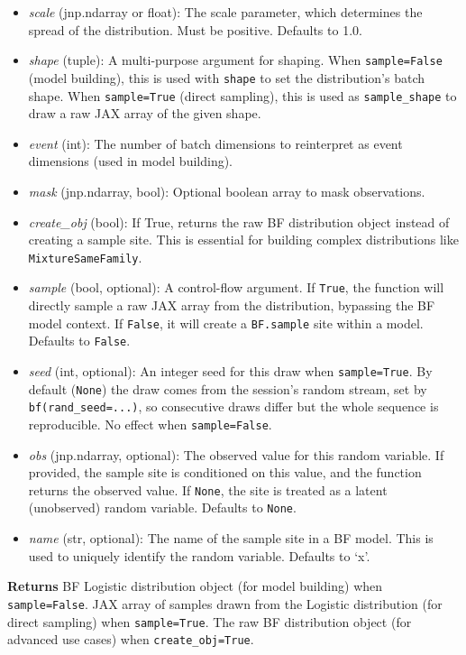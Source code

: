 \documentclass[
  letterpaper,
  DIV=11,
  numbers=noendperiod]{scrartcl}
\begin{document}
\begin{itemize}
\item
  \emph{scale} (jnp.ndarray or float): The scale parameter, which
  determines the spread of the distribution. Must be positive. Defaults
  to 1.0.
\item
  \emph{shape} (tuple): A multi-purpose argument for shaping. When
  \texttt{sample=False} (model building), this is used with
  \texttt{shape} to set the distribution's batch shape. When
  \texttt{sample=True} (direct sampling), this is used as
  \texttt{sample\_shape} to draw a raw JAX array of the given shape.
\item
  \emph{event} (int): The number of batch dimensions to reinterpret as
  event dimensions (used in model building).
\item
  \emph{mask} (jnp.ndarray, bool): Optional boolean array to mask
  observations.
\item
  \emph{create\_obj} (bool): If True, returns the raw BF distribution
  object instead of creating a sample site. This is essential for
  building complex distributions like \texttt{MixtureSameFamily}.
\item
  \emph{sample} (bool, optional): A control-flow argument. If
  \texttt{True}, the function will directly sample a raw JAX array from
  the distribution, bypassing the BF model context. If \texttt{False},
  it will create a \texttt{BF.sample} site within a model. Defaults to
  \texttt{False}.
\item
  \emph{seed} (int, optional): An integer seed for this draw when
  \texttt{sample=True}. By default (\texttt{None}) the draw comes from
  the session's random stream, set by \texttt{bf(rand\_seed=...)}, so
  consecutive draws differ but the whole sequence is reproducible. No
  effect when \texttt{sample=False}.
\item
  \emph{obs} (jnp.ndarray, optional): The observed value for this random
  variable. If provided, the sample site is conditioned on this value,
  and the function returns the observed value. If \texttt{None}, the
  site is treated as a latent (unobserved) random variable. Defaults to
  \texttt{None}.
\item
  \emph{name} (str, optional): The name of the sample site in a BF
  model. This is used to uniquely identify the random variable. Defaults
  to `x'.
\end{itemize}

\textbf{Returns} BF Logistic distribution object (for model building)
when \texttt{sample=False}. JAX array of samples drawn from the Logistic
distribution (for direct sampling) when \texttt{sample=True}. The raw BF
distribution object (for advanced use cases) when
\texttt{create\_obj=True}.
\end{document}
